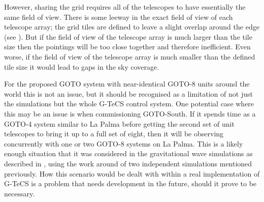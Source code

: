 \begin{colsection}
\begin{colsection}
\newpage

However, sharing the grid requires all of the telescopes to have essentially the same field of view. There is some leeway in the exact field of view of each telescope array; the grid tiles are defined to leave a slight overlap around the edge (see ). But if the field of view of the telescope array is much larger than the tile size then the pointings will be too close together and therefore inefficient. Even worse, if the field of view of the telescope array is much smaller than the defined tile size it would lead to gaps in the sky coverage.

For the proposed GOTO system with near-identical GOTO-8 units around the world this is not an issue, but it should be recognised as a limitation of not just the simulations but the whole G-TeCS control system. One potential case where this may be an issue is when commissioning GOTO-South. If it spends time as a GOTO-4 system similar to La Palma before getting the second set of unit telescopes to bring it up to a full set of eight, then it will be observing concurrently with one or two GOTO-8 systems on La Palma. This is a likely enough situation that it was considered in the gravitational wave simulations as described in , using the work around of two independent simulations mentioned previously. How this scenario would be dealt with within a real implementation of G-TeCS is a problem that needs development in the future, should it prove to be necessary.

\end{colsection}


\end{colsection}


\newpage
